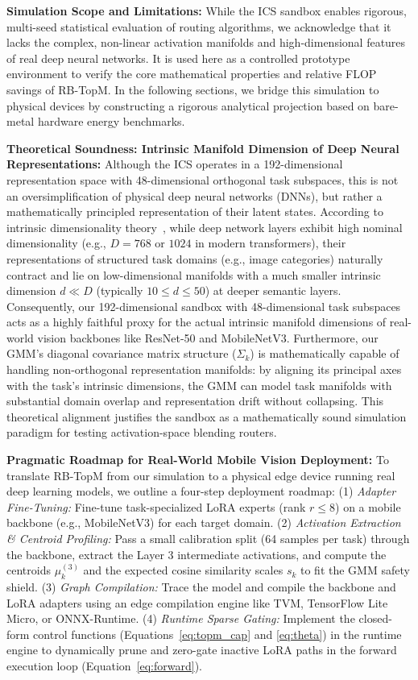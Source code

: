 \textbf{Simulation Scope and Limitations:} While the ICS sandbox enables rigorous, multi-seed statistical evaluation of routing algorithms, we acknowledge that it lacks the complex, non-linear activation manifolds and high-dimensional features of real deep neural networks. It is used here as a controlled prototype environment to verify the core mathematical properties and relative FLOP savings of RB-TopM. In the following sections, we bridge this simulation to physical devices by constructing a rigorous analytical projection based on bare-metal hardware energy benchmarks.

\textbf{Theoretical Soundness: Intrinsic Manifold Dimension of Deep Neural Representations:} Although the ICS operates in a 192-dimensional representation space with 48-dimensional orthogonal task subspaces, this is not an oversimplification of physical deep neural networks (DNNs), but rather a mathematically principled representation of their latent states. According to intrinsic dimensionality theory~\citep{li2018measuring, ansuini2019intrinsic, pope2021intrinsic}, while deep network layers exhibit high nominal dimensionality (e.g., $D = 768$ or $1024$ in modern transformers), their representations of structured task domains (e.g., image categories) naturally contract and lie on low-dimensional manifolds with a much smaller intrinsic dimension $d \ll D$ (typically $10 \le d \le 50$) at deeper semantic layers. Consequently, our 192-dimensional sandbox with 48-dimensional task subspaces acts as a highly faithful proxy for the actual intrinsic manifold dimensions of real-world vision backbones like ResNet-50 and MobileNetV3. Furthermore, our GMM's diagonal covariance matrix structure ($\Sigma_k$) is mathematically capable of handling non-orthogonal representation manifolds: by aligning its principal axes with the task's intrinsic dimensions, the GMM can model task manifolds with substantial domain overlap and representation drift without collapsing. This theoretical alignment justifies the sandbox as a mathematically sound simulation paradigm for testing activation-space blending routers.

\textbf{Pragmatic Roadmap for Real-World Mobile Vision Deployment:} To translate RB-TopM from our simulation to a physical edge device running real deep learning models, we outline a four-step deployment roadmap: (1) \emph{Adapter Fine-Tuning:} Fine-tune task-specialized LoRA experts (rank $r \le 8$) on a mobile backbone (e.g., MobileNetV3) for each target domain. (2) \emph{Activation Extraction \& Centroid Profiling:} Pass a small calibration split (64 samples per task) through the backbone, extract the Layer 3 intermediate activations, and compute the centroids $\mu^{(3)}_k$ and the expected cosine similarity scales $s_k$ to fit the GMM safety shield. (3) \emph{Graph Compilation:} Trace the model and compile the backbone and LoRA adapters using an edge compilation engine like TVM, TensorFlow Lite Micro, or ONNX-Runtime. (4) \emph{Runtime Sparse Gating:} Implement the closed-form control functions (Equations~\ref{eq:topm_cap} and \ref{eq:theta}) in the runtime engine to dynamically prune and zero-gate inactive LoRA paths in the forward execution loop (Equation~\ref{eq:forward}).

